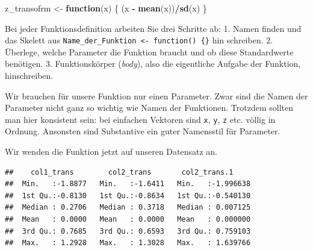 \documentclass[]{book}
\newenvironment{Shaded}{\begin{snugshade}}{\end{snugshade}}
\newcommand{\ControlFlowTok}[1]{\textcolor[rgb]{0.13,0.29,0.53}{\textbf{#1}}}
\newcommand{\DataTypeTok}[1]{\textcolor[rgb]{0.13,0.29,0.53}{#1}}
\newcommand{\DecValTok}[1]{\textcolor[rgb]{0.00,0.00,0.81}{#1}}
\newcommand{\KeywordTok}[1]{\textcolor[rgb]{0.13,0.29,0.53}{\textbf{#1}}}
\newcommand{\NormalTok}[1]{#1}
\newcommand{\OperatorTok}[1]{\textcolor[rgb]{0.81,0.36,0.00}{\textbf{#1}}}
\newcommand{\StringTok}[1]{\textcolor[rgb]{0.31,0.60,0.02}{#1}}
\begin{document}
\begin{Shaded}
\begin{Highlighting}[]
\NormalTok{z_transofrm <-}\StringTok{ }\ControlFlowTok{function}\NormalTok{(x) \{}
\NormalTok{  (x }\OperatorTok{-}\StringTok{ }\KeywordTok{mean}\NormalTok{(x))}\OperatorTok{/}\KeywordTok{sd}\NormalTok{(x)}
\NormalTok{\}}
\end{Highlighting}
\end{Shaded}

Bei jeder Funktionsdefinition arbeiten Sie drei Schritte ab:
1. Namen finden und das Skelett aus \texttt{Name\_der\_Funktion\ \textless{}-\ function()\ \{\}} hin schreiben.
2. Überlege, welche Parameter die Funktion braucht und ob diese Standardwerte benötigen.
3. Funktionskörper (\emph{body}), also die eigentliche Aufgabe der Funktion, hinschreiben.

Wir brauchen für unsere Funktion nur einen Parameter. Zwar sind die Namen der Parameter nicht ganz so wichtig wie Namen der Funktionen. Trotzdem sollten man hier konsistent sein: bei einfachen Vektoren sind \texttt{x}, \texttt{y}, \texttt{z} etc. völlig in Ordnung. Ansonsten sind Substantive ein guter Namensstil für Parameter.

Wir wenden die Funktion jetzt auf unseren Datensatz an.

\begin{Shaded}
\end{Shaded}

\begin{verbatim}
##    col1_trans        col2_trans       col2_trans.1      
##  Min.   :-1.8877   Min.   :-1.6411   Min.   :-1.996638  
##  1st Qu.:-0.8130   1st Qu.:-0.8634   1st Qu.:-0.540130  
##  Median : 0.2706   Median : 0.3718   Median : 0.007125  
##  Mean   : 0.0000   Mean   : 0.0000   Mean   : 0.000000  
##  3rd Qu.: 0.7685   3rd Qu.: 0.6593   3rd Qu.: 0.759103  
##  Max.   : 1.2928   Max.   : 1.3028   Max.   : 1.639766
\end{verbatim}
\end{document}
